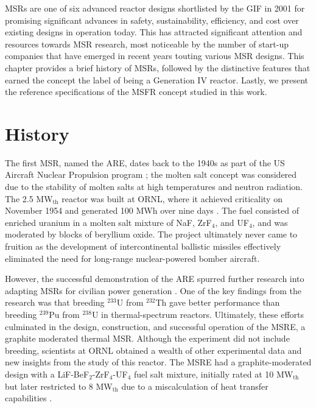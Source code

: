 \glspl{MSR} are one of six advanced reactor designs shortlisted by
the \gls{GIF} in 2001 for promising significant advances in safety,
sustainability, efficiency, and cost over existing designs in operation
today. This has attracted significant attention and resources towards
\gls{MSR} research, most noticeable by the number of start-up companies that
have emerged in recent years touting various \gls{MSR} designs. This chapter
provides a brief history of \glspl{MSR}, followed by the distinctive features
that earned the concept the label of being a Generation IV reactor. Lastly,
we present the reference specifications of the \gls{MSFR} concept studied in
this work.

\section{History}

The first \gls{MSR}, named the \gls{ARE}, dates back to the 1940s
as part of the US Aircraft Nuclear Propulsion program
\cite{rosenthal_molten-salt_1970}; the molten salt concept was considered due
to the stability of molten salts at high temperatures and neutron radiation.
The 2.5 MW$_{\text{th}}$ reactor was built at \gls{ORNL}, where it achieved
criticality on November 1954 and generated 100 MWh over nine days
\cite{rosenthal_molten-salt_1970}. The fuel
consisted of enriched uranium in a molten salt mixture of NaF, ZrF$_4$, and
UF$_4$, and was moderated by blocks of beryllium oxide. The project ultimately
never came to fruition as the development of intercontinental ballistic
missiles effectively eliminated the need for long-range nuclear-powered
bomber aircraft.

However, the successful demonstration of the \gls{ARE} spurred further
research into adapting \glspl{MSR} for civilian power generation
\cite{rosenthal_molten-salt_1970}. One of the key findings from the
research was that breeding $^{233}$U from $^{232}$Th gave better performance
than breeding $^{239}$Pu from $^{238}$U in thermal-spectrum reactors.
Ultimately, these efforts culminated in the design, construction, and
successful operation of the \gls{MSRE}, a graphite moderated thermal
\gls{MSR}. Although the experiment did not include breeding, scientists at
\gls{ORNL} obtained a wealth of other experimental data and new insights from
the study of this reactor. The \gls{MSRE} had a
graphite-moderated design with a LiF-BeF$_2$-ZrF$_4$-UF$_4$ fuel salt mixture,
initially rated at 10 MW$_{\text{th}}$ but later restricted to 8
MW$_{\text{th}}$ due to a miscalculation of heat transfer capabilities
\cite{haubenreich_experience_1970}. 

